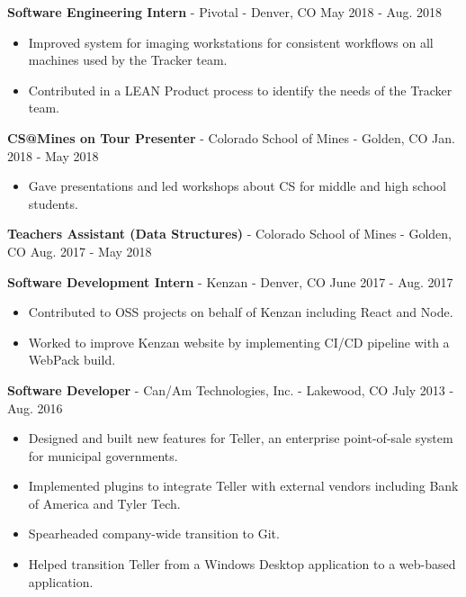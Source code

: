 \documentclass[10pt,letterpaper]{article}
\begin{document}
\textbf{Software Engineering Intern} - Pivotal - Denver, CO
\hfill May 2018 - Aug. 2018
\begin{itemize}
    \item Improved system for imaging workstations for consistent workflows on
        all machines used by the Tracker team.
    \item Contributed in a LEAN Product process to identify the needs of the
        Tracker team.
\end{itemize}

\vspace{2pt}
\textbf{CS@Mines on Tour Presenter} - Colorado School of Mines -
Golden, CO \hfill Jan. 2018 - May 2018
\begin{itemize}
    \item Gave presentations and led workshops about CS for middle and high
        school students.
\end{itemize}

\vspace{2pt}
\textbf{Teachers Assistant (Data Structures)} - Colorado School of Mines -
Golden, CO \hfill Aug. 2017 - May 2018

\vspace{2pt}
\textbf{Software Development Intern} - Kenzan - Denver, CO
\hfill June 2017 - Aug. 2017
\begin{itemize}
    \item Contributed to OSS projects on behalf of Kenzan including React and
        Node.
    \item Worked to improve Kenzan website by implementing CI/CD pipeline with
        a WebPack build.
\end{itemize}

\vspace{2pt}
\textbf{Software Developer} - Can/Am Technologies, Inc. - Lakewood, CO
\hfill July 2013 - Aug. 2016
\begin{itemize}
    \item Designed and built new features for Teller, an enterprise
        point-of-sale system for municipal governments.
    \item Implemented plugins to integrate Teller with external vendors
        including Bank of America and Tyler Tech.
    \item Spearheaded company-wide transition to Git.
    \item Helped transition Teller from a Windows Desktop application to a
        web-based application.
\end{itemize}
\end{document}
